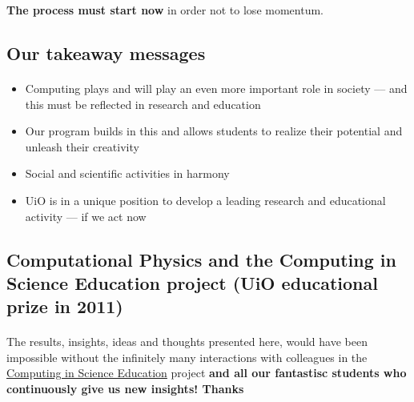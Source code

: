 \documentclass[%
twoside,                 %
final,                   %
10pt]{article}
\begin{document}
\noindent



\textbf{The process must start now} in order not to lose momentum.



\subsection{Our takeaway messages}

\paragraph{}
\begin{itemize}
\item Computing plays and will play an even more important role in society --– and this must be reflected in research and education

\item Our program builds in this and allows students to realize their potential and unleash their creativity

\item Social and scientific activities in harmony

\item UiO is in a unique position to develop a leading research and educational activity --- if we act now
\end{itemize}

\noindent




\subsection{Computational Physics and  the Computing in Science Education project (UiO educational prize in 2011)}


\paragraph{}
The results, insights, ideas and thoughts presented here, would have been impossible without the infinitely many  interactions with colleagues in the \href{{http://www.mn.uio.no/english/about/collaboration/cse/}}{Computing in Science Education} project \textbf{and all our fantastisc students who continuously give us new insights! Thanks}
\end{document}
